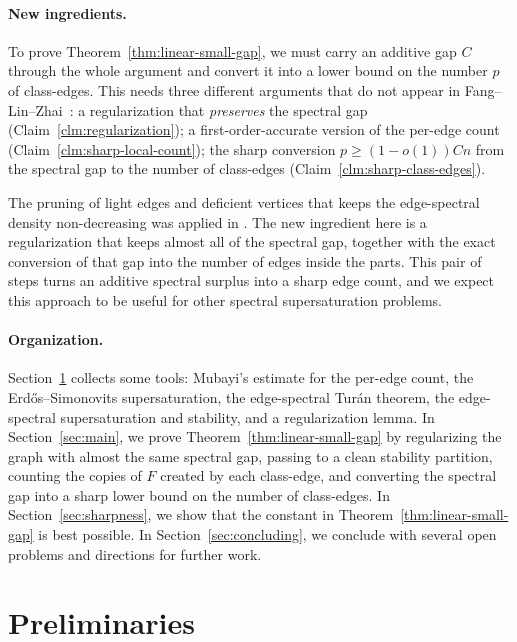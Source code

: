 \documentclass[11pt,a4paper]{article}
\theoremstyle{definition}
\theoremstyle{plain}
\renewcommand{\ge}{\geqslant}
\begin{document}
\paragraph{New ingredients.} 
 To prove Theorem~\ref{thm:linear-small-gap}, we must 
carry an additive gap $C$ through the whole argument and convert it into a lower bound on the number $p$ of class-edges. This needs three different arguments
that do not appear in Fang--Lin--Zhai~\cite{FLZ}: a regularization that \emph{preserves} the spectral gap
(Claim~\ref{clm:regularization}); a first-order-accurate version of the per-edge count (Claim~\ref{clm:sharp-local-count}); 
 the sharp conversion $p\ge(1-o(1))Cn$ from the spectral gap to the
number of class-edges (Claim~\ref{clm:sharp-class-edges}). 

 The pruning of
light edges and deficient vertices that keeps the edge-spectral
density non-decreasing was applied in  \cite{Niki2021,NZ2021b,FLZ}. 
 The new ingredient here is a
regularization that keeps almost all of the spectral gap, together with the exact conversion
of that gap into the number of edges inside the parts. This pair of steps turns an
additive spectral surplus into a sharp edge count, 
and we expect this approach to be useful 
for other spectral supersaturation problems.

\paragraph{Organization.}
  Section~\ref{sec:prelim} collects 
some tools: Mubayi's estimate for the per-edge count, the Erd\H{o}s--Simonovits supersaturation, 
the edge-spectral Tur\'an
theorem, the edge-spectral supersaturation and stability, and a regularization lemma. In Section~\ref{sec:main}, we prove Theorem~\ref{thm:linear-small-gap} by regularizing the graph with almost the same spectral
gap, passing to a clean stability partition, counting the copies of $F$ created by each
class-edge, and converting the spectral gap into a sharp lower bound on the number of class-edges.
In Section~\ref{sec:sharpness}, we show that the constant in Theorem~\ref{thm:linear-small-gap} is best possible. 
In Section~\ref{sec:concluding}, we conclude with several open
problems and directions for further work.


\section{Preliminaries}

\label{sec:prelim}
\end{document}
